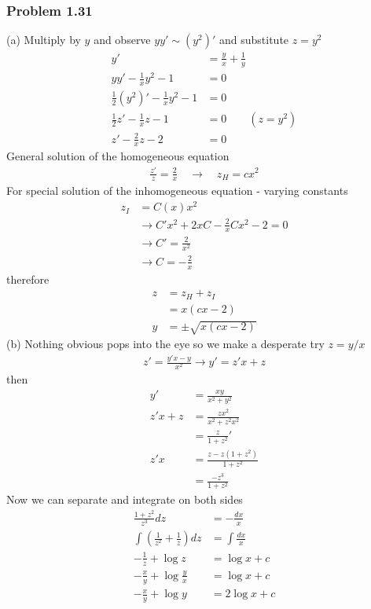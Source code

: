\documentclass[10pt,a4paper]{article}
\theoremstyle{definition}
\begin{document}
\subsubsection{Problem 1.31}
(a) Multiply by $y$ and observe $yy'\sim(y^2)'$ and substitute $z=y^2$
\begin{align}
y'&=\frac{y}{x}+\frac{1}{y}\\
yy'-\frac{1}{x}y^2-1&=0\\
\frac{1}{2}(y^2)'-\frac{1}{x}y^2-1&=0\\
\frac{1}{2}z'-\frac{1}{x}z-1&=0\qquad(z=y^2)\\
z'-\frac{2}{x}z-2&=0
\end{align}
General solution of the homogeneous equation
\begin{align}
\frac{z'}{z}=\frac{2}{x}\quad\rightarrow\quad z_H=cx^2
\end{align}
For special solution of the inhomogeneous equation - varying constants
\begin{align}
z_I&=C(x)x^2\\
&\rightarrow C'x^2+2xC-\frac{2}{x}Cx^2-2=0\\
&\rightarrow C'=\frac{2}{x^2}\\
&\rightarrow C=-\frac{2}{x}
\end{align}
therefore
\begin{align}
z&=z_H+z_I\\
&=x(cx-2)\\
y&=\pm\sqrt{x(cx-2)}
\end{align}
(b) Nothing obvious pops into the eye so we make a desperate try $z=y/x$
\begin{align}
z'=\frac{y'x-y}{x^2}\rightarrow y'=z'x+z
\end{align}
then
\begin{align}
y'&=\frac{xy}{x^2+y^2}\\
z'x+z
&=\frac{zx^2}{x^2+z^2x^2}\\
&=\frac{z}{1+z^2}'\\
z'x&=\frac{z-z(1+z^2)}{1+z^2}\\
&=\frac{-z^3}{1+z^2}
\end{align}
Now we can separate and integrate on both sides
\begin{align}
\frac{1+z^2}{z^3}dz&=-\frac{dx}{x}\\
\int\left(\frac{1}{z^2}+\frac{1}{z}\right)dz&=\int\frac{dx}{x}\\
-\frac{1}{z}+\log z&=\log{x}+c\\
-\frac{x}{y}+\log\frac{y}{x}&=\log{x}+c\\
-\frac{x}{y}+\log y&=2\log{x}+c
\end{align}
\end{document}
